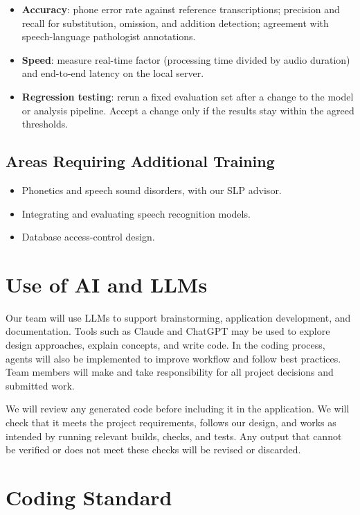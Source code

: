 \documentclass{article}
\begin{document}
\begin{itemize}
\item \textbf{Accuracy}: phone error rate against reference transcriptions;
  precision and recall for substitution, omission, and addition detection;
  agreement with speech-language pathologist annotations.
\item \textbf{Speed}: measure real-time factor (processing time divided by
  audio duration) and end-to-end latency on the local server.
\item \textbf{Regression testing}: rerun a fixed evaluation set after a
  change to the model or analysis pipeline. Accept a change only if the
  results stay within the agreed thresholds.
\end{itemize}

\subsection{Areas Requiring Additional Training}

\begin{itemize}
\item Phonetics and speech sound disorders, with our SLP advisor.
\item Integrating and evaluating speech recognition models.
\item Database access-control design.
\end{itemize}

\section{Use of AI and LLMs}

Our team will use LLMs to support brainstorming, application development, and documentation. Tools such as Claude and ChatGPT may be used to explore design approaches, explain concepts, and  write code. In the coding process, agents will also be implemented to improve workflow and follow best practices. Team members will make and take responsibility for all project decisions and submitted work.

We will review any generated code before including it in the application. We will check that it meets the project requirements, follows our design, and works as intended by running relevant builds, checks, and tests. Any output that cannot be verified or does not meet these checks will be revised or discarded.

\section{Coding Standard}
\end{document}
